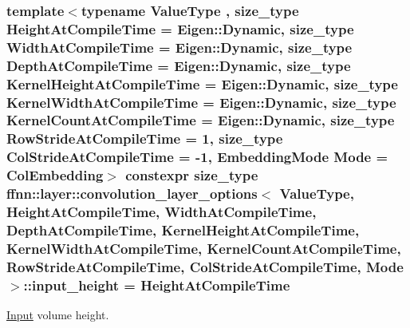 \hypertarget{structffnn_1_1layer_1_1convolution__layer__options_a9bbe1f21e099830ff076e893842d80ef}{
\subsubsection[{input\-\_\-height}]{\setlength{\rightskip}{0pt plus 5cm}template$<$typename Value\-Type , size\-\_\-type Height\-At\-Compile\-Time = Eigen\-::\-Dynamic, size\-\_\-type Width\-At\-Compile\-Time = Eigen\-::\-Dynamic, size\-\_\-type Depth\-At\-Compile\-Time = Eigen\-::\-Dynamic, size\-\_\-type Kernel\-Height\-At\-Compile\-Time = Eigen\-::\-Dynamic, size\-\_\-type Kernel\-Width\-At\-Compile\-Time = Eigen\-::\-Dynamic, size\-\_\-type Kernel\-Count\-At\-Compile\-Time = Eigen\-::\-Dynamic, size\-\_\-type Row\-Stride\-At\-Compile\-Time = 1, size\-\_\-type Col\-Stride\-At\-Compile\-Time = -\/1, Embedding\-Mode Mode = Col\-Embedding$>$ constexpr {\bf size\-\_\-type} {\bf ffnn\-::layer\-::convolution\-\_\-layer\-\_\-options}$<$ Value\-Type, Height\-At\-Compile\-Time, Width\-At\-Compile\-Time, Depth\-At\-Compile\-Time, Kernel\-Height\-At\-Compile\-Time, Kernel\-Width\-At\-Compile\-Time, Kernel\-Count\-At\-Compile\-Time, Row\-Stride\-At\-Compile\-Time, Col\-Stride\-At\-Compile\-Time, Mode $>$\-::input\-\_\-height = Height\-At\-Compile\-Time\hspace{0.3cm}{\ttfamily [static]}}}\label{structffnn_1_1layer_1_1convolution__layer__options_a9bbe1f21e099830ff076e893842d80ef}


\hyperlink{classffnn_1_1layer_1_1_input}{Input} volume height. 

